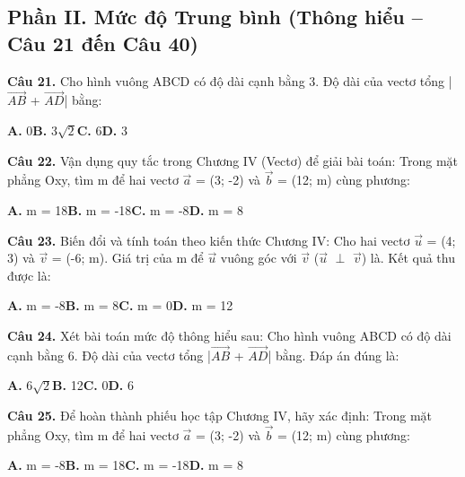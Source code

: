\documentclass[11pt,a4paper]{article}
\begin{document}
\subsection*{\color{accent} Phần II. Mức độ Trung bình (Thông hiểu -- Câu 21 đến Câu 40)}
\textbf{\color{primary} Câu 21.} Cho hình vuông ABCD có độ dài cạnh bằng 3. Độ dài của vectơ tổng |$\overrightarrow{AB}$ + $\overrightarrow{AD}$| bằng:\par
\hspace*{1.5em}\textbf{A.} 0\quad\quad \textbf{B.} 3$\sqrt{2}$\quad\quad \textbf{C.} 6\quad\quad \textbf{D.} 3\par\vspace{2pt}
\textbf{\color{primary} Câu 22.} Vận dụng quy tắc trong Chương IV (Vectơ) để giải bài toán: Trong mặt phẳng Oxy, tìm m để hai vectơ $\vec{a}$ = (3; -2) và $\vec{b}$ = (12; m) cùng phương:\par
\hspace*{1.5em}\textbf{A.} m = 18\quad\quad \textbf{B.} m = -18\quad\quad \textbf{C.} m = -8\quad\quad \textbf{D.} m = 8\par\vspace{2pt}
\textbf{\color{primary} Câu 23.} Biến đổi và tính toán theo kiến thức Chương IV: Cho hai vectơ $\vec{u}$ = (4; 3) và $\vec{v}$ = (-6; m). Giá trị của m để $\vec{u}$ vuông góc với $\vec{v}$ ($\vec{u}$ $\perp$ $\vec{v}$) là. Kết quả thu được là:\par
\hspace*{1.5em}\textbf{A.} m = -8\quad\quad \textbf{B.} m = 8\quad\quad \textbf{C.} m = 0\quad\quad \textbf{D.} m = 12\par\vspace{2pt}
\textbf{\color{primary} Câu 24.} Xét bài toán mức độ thông hiểu sau: Cho hình vuông ABCD có độ dài cạnh bằng 6. Độ dài của vectơ tổng |$\overrightarrow{AB}$ + $\overrightarrow{AD}$| bằng. Đáp án đúng là:\par
\hspace*{1.5em}\textbf{A.} 6$\sqrt{2}$\quad\quad \textbf{B.} 12\quad\quad \textbf{C.} 0\quad\quad \textbf{D.} 6\par\vspace{2pt}
\textbf{\color{primary} Câu 25.} Để hoàn thành phiếu học tập Chương IV, hãy xác định: Trong mặt phẳng Oxy, tìm m để hai vectơ $\vec{a}$ = (3; -2) và $\vec{b}$ = (12; m) cùng phương:\par
\hspace*{1.5em}\textbf{A.} m = -8\quad\quad \textbf{B.} m = 18\quad\quad \textbf{C.} m = -18\quad\quad \textbf{D.} m = 8\par\vspace{2pt}
\end{document}
